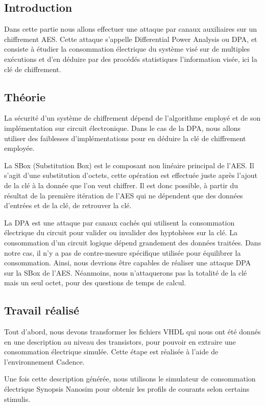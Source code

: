 \subsection{Introduction}

Dans cette partie nous allons effectuer une attaque par canaux auxiliaires
sur un chiffrement AES. Cette attaque s'appelle Differential Power Analysis ou
DPA, et consiste à étudier la consommation électrique du système visé sur de 
multiples exécutions et d'en déduire par des procédés statistiques l'information
visée, ici la clé de chiffrement.

\subsection{Théorie}
La sécurité d'un système de chiffrement dépend de l'algorithme employé et de 
son implémentation sur circuit électronique. Dans le cas de la DPA, nous allons 
utiliser des faiblesses d'implémentations pour en déduire la clé de chiffrement 
employée. 

La SBox (Substitution Box) est le composant non linéaire principal de l'AES. Il
s'agit d'une substitution d'octets, cette opération est effectuée juste après
l'ajout de la clé à la donnée que l'on veut chiffrer. Il est donc possible,
à partir du résultat de la première itération de l'AES qui ne dépendent que 
des données d'entrées et de la clé, de retrouver la clé.

La DPA est une attaque par canaux cachés qui utilisent la consommation
électrique du circuit pour valider ou invalider des hyptohèses sur la clé.
La consommation d'un circuit logique dépend grandement des données traitées.
Dans notre cas, il n'y a pas de contre-mesure spécifique utilisée pour
équilibrer la consommation. Ainsi, nous devrions être capables de réaliser
une attaque DPA sur la SBox de l'AES. Néanmoins, nous n'attaquerons pas 
la totalité de la clé mais un seul octet, pour des questions de temps de calcul.

\subsection{Travail réalisé}

Tout d'abord, nous devons transformer les fichiers VHDL qui nous ont été donnés
en une description au niveau des transistors, pour pouvoir en extraire une
consommation électrique simulée. Cette étape est réalisée à l'aide de
l'environnement Cadence.

Une fois cette description générée, nous utilisons le simulateur de consommation
électrique Synopsis Nanosim pour obtenir les profils de courants selon certains 
stimulis.

